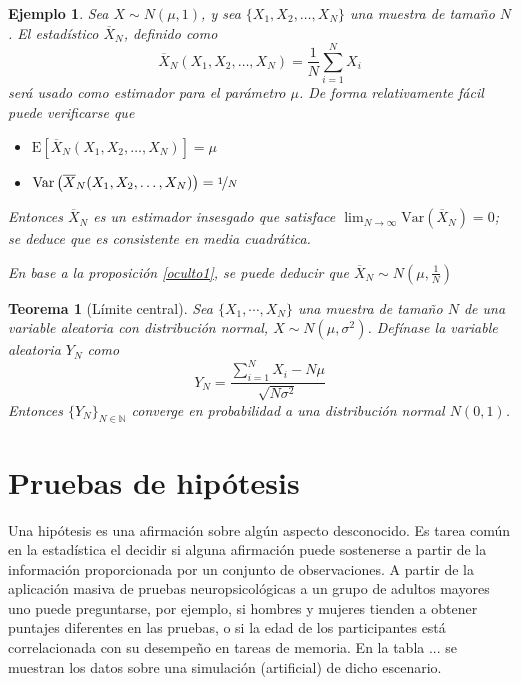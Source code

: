 \documentclass[12pt,letterpaper]{book}
\newtheorem{teorema}{Teorema}[chapter]
\newtheorem{ejemplo}{Ejemplo}[chapter]
\newcommand{\N}{\mathbb{N}}
\newcommand{\E}[1]{\mathrm{E}\left[ #1 \right]}
\newcommand{\Var}[1]{\mathrm{Var}\left( #1 \right)}
\begin{document}
\begin{ejemplo}
Sea $X\sim N(\mu,1)$, y sea $\{ X_1, X_2, \dots, X_N \}$ una muestra de tamaño $N$. El estadístico $\overline{X}_N$, definido como
\begin{equation}
\overline{X}_N (X_1,X_2,\dots,X_N) = \frac{1}{N} \sum_{i=1}^N X_i
\end{equation}
será usado como estimador para el parámetro $\mu$.
%
De forma relativamente fácil puede verificarse que
\begin{itemize}
\item $\E{\overline{X}_N (X_1,X_2,\dots,X_N)} = \mu$
\item $\Var{\overline{X}_N (X_1,X_2,\dots,X_N)} = \nicefrac{1}{N}$
\end{itemize}

Entonces $\overline{X}_N$ es un estimador insesgado que satisface $\lim_{N\rightarrow\infty} \Var{\overline{X}_N}=0$; se deduce que es consistente en media cuadrática.

En base a la proposición \ref{oculto1}, se puede deducir que $\overline{X}_N \sim N\left(\mu,\frac{1}{N}\right)$
\end{ejemplo}

\begin{teorema}[Límite central]
Sea $\{ X_1, \cdots, X_N\}$ una muestra de tamaño $N$ de una variable aleatoria con distribución normal, $X\sim N(\mu,\sigma^{2})$. Defínase la variable aleatoria $Y_N$ como
\begin{equation}
Y_N = \frac{\sum_{i=1}^{N}X_i - N \mu}{\sqrt{N \sigma^{2}}}
\end{equation}
Entonces $\{ Y_N \}_{N \in \N}$ converge en probabilidad a una distribución normal $N(0,1)$.
\end{teorema}



\section{Pruebas de hipótesis}


Una hipótesis es una afirmación sobre algún aspecto desconocido.
%
Es tarea común en la estadística el decidir si alguna afirmación puede sostenerse a partir de la
información proporcionada por un conjunto de observaciones. 
%
A partir de la aplicación masiva de pruebas neuropsicológicas a un grupo de adultos mayores uno 
puede preguntarse, por ejemplo, si hombres y mujeres tienden a obtener puntajes diferentes en las
pruebas, o si la edad de los participantes está correlacionada con su desempeño en tareas de 
memoria.
%
En la tabla ... se muestran los datos sobre una simulación (artificial) de dicho escenario.
\end{document}
